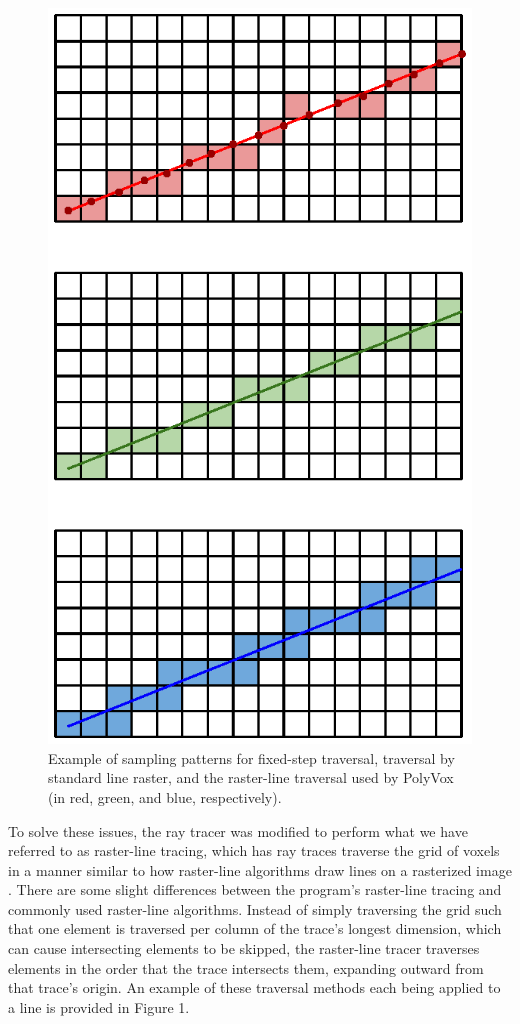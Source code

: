 \documentclass[onecolumn, draftclsnofoot,10pt, compsoc]{IEEEtran}
\begin{document}
\begin{figure}[h]
\centering
\includegraphics[scale=1.00]{Trace.eps}
\caption{Example of sampling patterns for fixed-step traversal, traversal by standard line raster, and the raster-line traversal used by PolyVox (in red, green, and blue, respectively).}
\end{figure}


To solve these issues, the ray tracer was modified to perform what we have referred to as raster-line tracing, which has ray traces traverse the grid of voxels in a manner similar to how raster-line algorithms draw lines on a rasterized image \cite{rasterline}. There are some slight differences between the program’s raster-line tracing and commonly used raster-line algorithms. Instead of simply traversing the grid such that one element is traversed per column of the trace’s longest dimension, which can cause intersecting elements to be skipped, the raster-line tracer traverses elements in the order that the trace intersects them, expanding outward from that trace’s origin. An example of these traversal methods each being applied to a line is provided in Figure 1.
\end{document}
